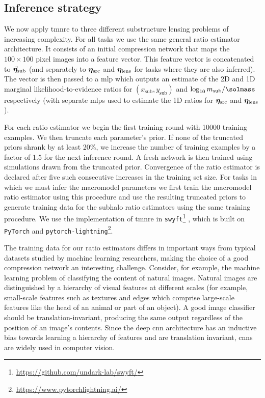 \subsection{Inference strategy}
\label{subsec:sub-nn}


We now apply \gls*{tmnre} to three different substructure lensing problems of increasing complexity. For all tasks we use the same general ratio estimator architecture. It consists of an initial compression network that maps the $100 \times 100$ pixel images into a feature vector. This feature vector is concatenated to $\vec{{\bm{\eta}}}_\mathrm{sub}$ (and separately to $\bm{\eta}_\mathrm{src}$ and $\bm{\eta}_\mathrm{lens}$ for tasks where they are also inferred). The vector is then passed to a \gls*{mlp} which outputs an estimate of the 2D and 1D marginal likelihood-to-evidence ratios for $(x_\mathrm{sub}, y_\mathrm{sub})$ and $\log_{10} m_\mathrm{sub} / \si{\solmass}$ respectively (with separate \gls*{mlp}s used to estimate the 1D ratios for $\bm{\eta}_\mathrm{src}$ and $\bm{\eta}_\mathrm{lens}$).

For each ratio estimator we begin the first training round with \num{10000} training examples. We then truncate each parameter's prior. If none of the truncated priors shrank by at least 20\%, we increase the number of training examples by a factor of \num{1.5} for the next inference round. A fresh network is then trained using simulations drawn from the truncated prior. Convergence of the ratio estimator is declared after five such consecutive increases in the training set size. For tasks in which we must infer the macromodel parameters we first train the macromodel ratio estimator using this procedure and use the resulting truncated priors to generate training data for the subhalo ratio estimators using the same training procedure. We use the implementation of \gls*{tmnre} in \texttt{swyft}\footnote{
    \url{https://github.com/undark-lab/swyft/}
} \citep{Miller:2022shs}, which is built on \texttt{PyTorch} and \texttt{pytorch-lightning}\footnote{
    \url{https://www.pytorchlightning.ai/}
}.

The training data for our ratio estimators differs in important ways from typical datasets studied by machine learning researchers, making the choice of a good compression network an interesting challenge. Consider, for example, the machine learning problem of classifying the content of natural images. Natural images are distinguished by a hierarchy of visual features at different scales (for example, small-scale features such as textures and edges which comprise large-scale features like the head of an animal or part of an object). A good image classifier should be translation-invariant, producing the same output regardless of the position of an image's contents. Since the deep \gls*{cnn} architecture has an inductive bias towards learning a hierarchy of features and are translation invariant, \gls*{cnn}s are widely used in computer vision.

